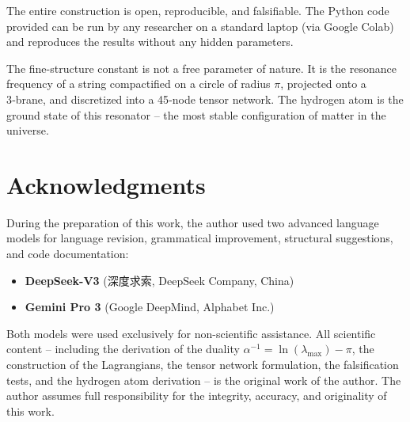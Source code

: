 \documentclass[12pt]{article}
\begin{document}
The entire construction is open, reproducible, and falsifiable. The Python code provided can be run by any researcher on a standard laptop (via Google Colab) and reproduces the results without any hidden parameters.

The fine-structure constant is not a free parameter of nature. It is the resonance frequency of a string compactified on a circle of radius \(\pi\), projected onto a 3‑brane, and discretized into a 45‑node tensor network. The hydrogen atom is the ground state of this resonator – the most stable configuration of matter in the universe.

\section*{Acknowledgments}

During the preparation of this work, the author used two advanced language models for language revision, grammatical improvement, structural suggestions, and code documentation:

\begin{itemize}
    \item \textbf{DeepSeek-V3} (深度求索, DeepSeek Company, China)
    \item \textbf{Gemini Pro 3} (Google DeepMind, Alphabet Inc.)
\end{itemize}

Both models were used exclusively for non-scientific assistance. All scientific content – including the derivation of the duality \(\alpha^{-1} = \ln(\lambda_{\max}) - \pi\), the construction of the Lagrangians, the tensor network formulation, the falsification tests, and the hydrogen atom derivation – is the original work of the author. The author assumes full responsibility for the integrity, accuracy, and originality of this work.

\newpage
\end{document}
